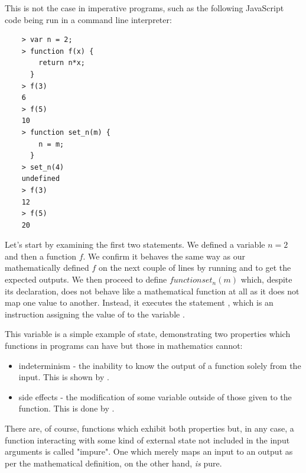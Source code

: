 This is not the case in imperative programs, such as the following JavaScript code being run in a command line interpreter:

\begin{lstlisting}
    > var n = 2;
    > function f(x) {
        return n*x;
      }
    > f(3)
    6
    > f(5)
    10
    > function set_n(m) {
        n = m;
      }
    > set_n(4)
    undefined
    > f(3)
    12
    > f(5)
    20
\end{lstlisting}

Let's start by examining the first two statements. We defined a variable $n=2$ and then a function $f$. We confirm it behaves the same way as our mathematically defined $f$ on the next couple of lines by running  and  to get the expected outputs. We then proceed to define $function set_n(m)$ which, despite its declaration, does not behave like a mathematical function at all as it does not map one value to another. Instead, it executes the statement , which is an instruction assigning the value of  to the variable .

This variable is a simple example of state, demonstrating two properties which functions in programs can have but those in mathematics cannot:

\begin{itemize}
    \item indeterminism - the inability to know the output of a function solely from the input. This is shown by .
    \item side effects - the modification of some variable outside of those given to the function. This is done by .
\end{itemize}

There are, of course, functions which exhibit both properties but, in any case, a function interacting with some kind of external state not included in the input arguments is called "impure". One which merely maps an input to an output as per the mathematical definition, on the other hand, {\it is} pure.

